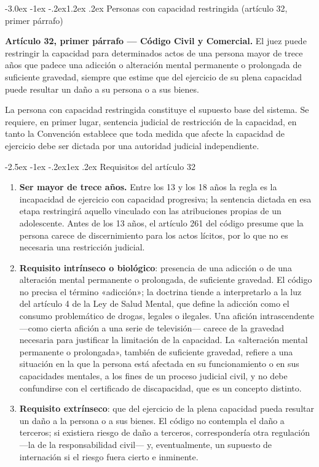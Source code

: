 \documentclass[12pt,oneside]{book}
\makeatletter
\renewcommand\section{\@startsection{section}{1}{\z@}%
  {-3.0ex \@plus -1ex \@minus -.2ex}{1.2ex \@plus .2ex}%
  {\normalfont\large\bfseries\color{acento}}}
\renewcommand\subsection{\@startsection{subsection}{2}{\z@}%
  {-2.5ex \@plus -1ex \@minus -.2ex}{1ex \@plus .2ex}%
  {\normalfont\normalsize\bfseries}}
\makeatother
\begin{document}
\section{Personas con capacidad restringida (artículo 32, primer párrafo)}

\begin{importante}
\textbf{Artículo 32, primer párrafo --- Código Civil y Comercial.} El juez puede restringir la capacidad para determinados actos de una persona mayor de trece años que padece una adicción o alteración mental permanente o prolongada de suficiente gravedad, siempre que estime que del ejercicio de su plena capacidad puede resultar un daño a su persona o a sus bienes.
\end{importante}

La persona con capacidad restringida constituye el supuesto base del sistema. Se requiere, en primer lugar, sentencia judicial de restricción de la capacidad, en tanto la Convención establece que toda medida que afecte la capacidad de ejercicio debe ser dictada por una autoridad judicial independiente.

\subsection{Requisitos del artículo 32}

\begin{enumerate}
\item \textbf{Ser mayor de trece años.} Entre los 13 y los 18 años la regla es la incapacidad de ejercicio con capacidad progresiva; la sentencia dictada en esa etapa restringirá aquello vinculado con las atribuciones propias de un adolescente. Antes de los 13 años, el artículo 261 del código presume que la persona carece de discernimiento para los actos lícitos, por lo que no es necesaria una restricción judicial.
\item \textbf{Requisito intrínseco o biológico}: presencia de una adicción o de una alteración mental permanente o prolongada, de suficiente gravedad. El código no precisa el término «adicción»; la doctrina tiende a interpretarlo a la luz del artículo 4 de la Ley de Salud Mental, que define la adicción como el consumo problemático de drogas, legales o ilegales. Una afición intrascendente ---como cierta afición a una serie de televisión--- carece de la gravedad necesaria para justificar la limitación de la capacidad. La «alteración mental permanente o prolongada», también de suficiente gravedad, refiere a una situación en la que la persona está afectada en su funcionamiento o en sus capacidades mentales, a los fines de un proceso judicial civil, y no debe confundirse con el certificado de discapacidad, que es un concepto distinto.
\item \textbf{Requisito extrínseco}: que del ejercicio de la plena capacidad pueda resultar un daño a la persona o a sus bienes. El código no contempla el daño a terceros; si existiera riesgo de daño a terceros, correspondería otra regulación ---la de la responsabilidad civil--- y, eventualmente, un supuesto de internación si el riesgo fuera cierto e inminente.
\end{enumerate}
\end{document}
